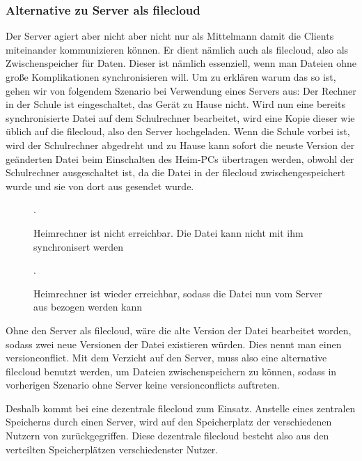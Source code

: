 \subsubsection{Alternative zu Server als \gls{filecloud}}
Der Server agiert aber nicht aber nicht nur als \glqq{} Mittelmann \grqq{} damit die
Clients miteinander kommunizieren können. Er dient nämlich auch als \gls{filecloud},
also als Zwischenspeicher für Daten. Dieser ist nämlich essenziell, wenn man
Dateien ohne große Komplikationen synchronisieren will. Um zu erklären warum das
so ist, gehen wir von folgendem Szenario bei Verwendung eines Servers aus:
Der Rechner in der Schule ist eingeschaltet, das Gerät zu Hause nicht. Wird nun
eine bereits synchronisierte Datei auf dem Schulrechner bearbeitet, wird eine Kopie dieser wie
üblich auf die \gls{filecloud}, also den Server hochgeladen. Wenn die Schule vorbei ist,
wird der Schulrechner abgedreht und zu Hause kann sofort die neuste Version der
geänderten  Datei beim Einschalten des Heim-PCs übertragen werden, obwohl der
Schulrechner ausgeschaltet ist, da die Datei in der \gls{filecloud}
zwischengespeichert wurde und sie von dort aus gesendet wurde.
\begin{figure}[h]
	\centering
  
  \caption{Heimrechner ist nicht erreichbar. Die Datei kann nicht mit ihm
	synchronisert werden}.
\end{figure}
\begin{figure}[h]
	\centering
  
  \caption{Heimrechner ist wieder erreichbar, sodass die Datei nun vom Server aus
	bezogen werden kann}.
\end{figure}

Ohne den Server als \gls{filecloud}, wäre die alte Version der Datei bearbeitet worden, sodass zwei
neue Versionen der Datei existieren würden. Dies nennt man einen \gls{versionconflict}.
Mit dem Verzicht auf den Server, muss also eine alternative \gls{filecloud} benutzt
werden, um Dateien zwischenspeichern zu können, sodass in vorherigen Szenario ohne Server
keine \glspl{versionconflict} auftreten.

Deshalb kommt bei \sblit eine dezentrale \gls{filecloud} zum Einsatz. Anstelle
eines zentralen Speicherns durch einen Server, wird auf den Speicherplatz der
verschiedenen Nutzern von \sblit zurückgegriffen. Diese dezentrale \gls{filecloud}
besteht also aus den verteilten Speicherplätzen verschiedenster Nutzer.

